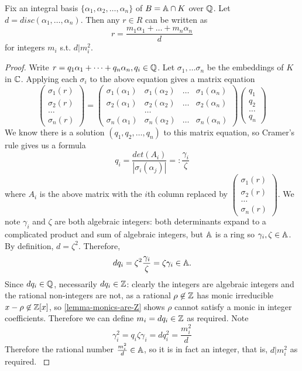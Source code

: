 \begin{prop}\label{number-ring-contained-in-free-abelian-group}
Fix an integral basis $\{\alpha_1,\alpha_2,\dots,\alpha_n\}$ of $B=\mathbb{A}\cap K$ over $\mathbb{Q}$. Let $d=disc(\alpha_1,\dots,\alpha_n)$. Then any $r\in R$ can be written as
$$r=\frac{m_1\alpha_1+\dots+m_n\alpha_n}{d}$$ for integers $m_i$ s.t. $d|m_i^2$.
\end{prop}
\begin{proof}
Write $r=q_1\alpha_1+\dots+q_n\alpha_n, q_i\in \mathbb{Q}$. Let $\sigma_1,\dots \sigma_n$ be the embeddings of $K$ in $\mathbb{C}$. Applying each $\sigma_i$ to the above equation gives  a matrix equation
$$\begin{pmatrix}\sigma_1(r)\\\sigma_2(r)\\\dots\\\sigma_n(r)\end{pmatrix}=\begin{pmatrix}\sigma_1(\alpha_1)&\sigma_1(\alpha_2)&\dots&\sigma_1(\alpha_n)\\\sigma_2(\alpha_1)&\sigma_2(\alpha_2)&\dots&\sigma_2(\alpha_n)\\&\dots\\\sigma_n(\alpha_1)&\sigma_n(\alpha_2)&\dots&\sigma_n(\alpha_n)\end{pmatrix}
\begin{pmatrix}q_1\\q_2\\\dots \\q_n
\end{pmatrix}
$$
We know there is a solution $(q_1,q_2,\dots,q_n)$ to this matrix equation, so Cramer's rule gives us a formula $$q_i=\frac{det(A_i)}{|\sigma_i(\alpha_j)|}=:\frac{\gamma_i}{\zeta}$$ where $A_i$ is the above matrix with the $i$th column replaced by $\begin{pmatrix}\sigma_1(r)\\\sigma_2(r)\\\dots\\\sigma_n(r)\end{pmatrix}$. We note $\gamma_i$ and $\zeta$ are both algebraic integers: both determinants expand to a complicated product and sum of algebraic integers, but $\mathbb{A}$ is a ring so $\gamma_i,\zeta\in \mathbb{A}$. By definition, $d=\zeta^2$. Therefore, $$dq_i=\zeta^2\frac{\gamma_i}{\zeta}=\zeta\gamma_i\in \mathbb{A}.$$ Since $dq_i\in \mathbb{Q}$, necessarily $dq_i\in \mathbb{Z}$: clearly the integers are algebraic integers and the rational non-integers are not, as a rational $\rho\not \in \mathbb{Z}$ has monic irreducible $x-\rho\not \in \mathbb{Z}[x]$, so \cref{lemma-monics-are-Z} shows $\rho$ cannot satisfy a monic in integer coefficients. Therefore we can define $m_i=dq_i\in \mathbb{Z}$ as required. Note $$\gamma_i^2=q_i\zeta \gamma_i=dq_i^2=\frac{m_i^2}{d}$$ Therefore the rational number $\frac{m_i^2}{d}\in \mathbb{A}$, so it is in fact an integer, that is, $d|m_i^2$ as required. 
\cite{NumberFields}
\end{proof}
